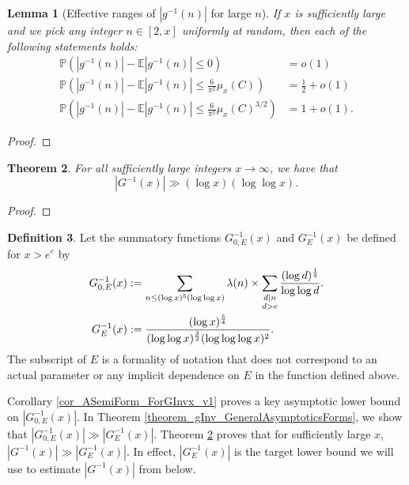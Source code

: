 \documentclass[11pt,reqno,a4letter]{article}
\numberwithin{figure}{section}
\numberwithin{table}{section}
\theoremstyle{plain}
\newtheorem{theorem}{Theorem}
\newtheorem{lemma}[theorem]{Lemma}
\numberwithin{theorem}{section}
\theoremstyle{definition}
\newtheorem{definition}[theorem]{Definition}
\begin{document}
\begin{lemma}[Effective ranges of $|g^{-1}(n)|$ for large $n$]
If $x$ is sufficiently large and we pick any integer $n \in [2, x]$ uniformly at random, then 
each of the following statements holds: 
\begin{align*} 
\tag{A}
\mathbb{P}\left(|g^{-1}(n)| - \mathbb{E}|g^{-1}(n)| \leq 0\right) & = o(1) \\ 
\tag{B} 
\mathbb{P}\left(|g^{-1}(n)| - \mathbb{E}|g^{-1}(n)| \leq \frac{6}{\pi^2} \mu_x(C)\right) & = 
     \frac{1}{2} + o(1) \\ 
\tag{C} 
\mathbb{P}\left(|g^{-1}(n)| - \mathbb{E}|g^{-1}(n)| \leq \frac{6}{\pi^2} \mu_x(C)^{3/2}\right) & = 
     1 + o(1). 
\end{align*} 
\end{lemma} 
\begin{proof} 
\end{proof} 

\begin{theorem} 
\label{theorem_GInvxLowerBoundByGEInvx_v1} 
For all sufficiently large integers $x \rightarrow \infty$, we have that 
\[
|G^{-1}(x)| \gg (\log x) (\log\log x). 
\]
\end{theorem} 
\begin{proof} 
\end{proof} 




\vskip 1in

\begin{definition} 
Let the summatory functions $G_{0,E}^{-1}(x)$ and $G_E^{-1}(x)$ 
be defined for $x > e^e$ by 
\begin{align} 
\label{eqn_GEInvxSummatoryFuncDef_v1} 
G_{0,E}^{-1}(x) & := \sum_{n \leq (\log x)^{5} (\log\log x)} \lambda(n) \times 
     \sum_{\substack{d|n \\ d > e}} \frac{(\log d)^{\frac{1}{4}}}{\log\log d}. \\ 
\notag 
G_E^{-1}(x) & := \frac{(\log x)^{\frac{5}{4}}}{(\log\log x)^{\frac{3}{2}} (\log\log\log x)^2}. 
\end{align} 
The subscript of $E$ is a formality of 
notation that does not correspond to an actual parameter or any 
implicit dependence on $E$ in the function defined above. 
\end{definition} 

Corollary \ref{cor_ASemiForm_ForGInvx_v1} 
proves a key asymptotic lower bound on $|G_{0,E}^{-1}(x)|$. 
In Theorem \ref{theorem_gInv_GeneralAsymptoticsForms}, we show that 
$|G_{0,E}^{-1}(x)| \gg |G_E^{-1}(x)|$. 
Theorem \ref{theorem_GInvxLowerBoundByGEInvx_v1} proves that for sufficiently large $x$, 
$|G^{-1}(x)| \gg |G_E^{-1}(x)|$. In effect, $|G_E^{-1}(x)|$ is the target lower bound we will 
use to estimate $|G^{-1}(x)|$ from below. 
\end{document}
